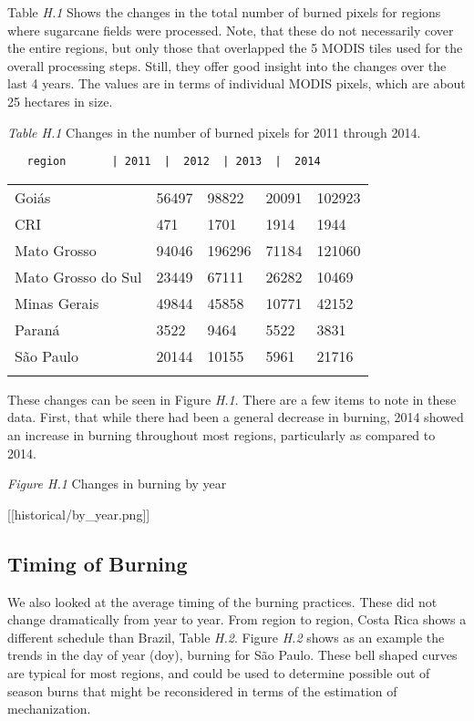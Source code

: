 \documentclass[]{article}
\begin{document}
Table \emph{H.1} Shows the changes in the total number of burned pixels
for regions where sugarcane fields were processed. Note, that these do
not necessarily cover the entire regions, but only those that overlapped
the 5 MODIS tiles used for the overall processing steps. Still, they
offer good insight into the changes over the last 4 years. The values
are in terms of individual MODIS pixels, which are about 25 hectares in
size.

\emph{Table H.1} Changes in the number of burned pixels for 2011 through
2014.

\begin{verbatim}
   region       | 2011  |  2012  | 2013  |  2014  
\end{verbatim}

\begin{longtable}[c]{@{}lllll@{}}
\toprule\addlinespace
Goiás & 56497 & 98822 & 20091 & 102923
\\\addlinespace
CRI & 471 & 1701 & 1914 & 1944
\\\addlinespace
Mato Grosso & 94046 & 196296 & 71184 & 121060
\\\addlinespace
Mato Grosso do Sul & 23449 & 67111 & 26282 & 10469
\\\addlinespace
Minas Gerais & 49844 & 45858 & 10771 & 42152
\\\addlinespace
Paraná & 3522 & 9464 & 5522 & 3831
\\\addlinespace
São Paulo & 20144 & 10155 & 5961 & 21716
\\\addlinespace
\bottomrule
\end{longtable}

These changes can be seen in Figure \emph{H.1}. There are a few items to
note in these data. First, that while there had been a general decrease
in burning, 2014 showed an increase in burning throughout most regions,
particularly as compared to 2014.

\emph{Figure H.1} Changes in burning by year

{[}{[}historical/by\_year.png{]}{]}

\subsection{Timing of Burning}\label{timing-of-burning}

We also looked at the average timing of the burning practices. These did
not change dramatically from year to year. From region to region, Costa
Rica shows a different schedule than Brazil, Table \emph{H.2}. Figure
\emph{H.2} shows as an example the trends in the day of year (doy),
burning for São Paulo. These bell shaped curves are typical for most
regions, and could be used to determine possible out of season burns
that might be reconsidered in terms of the estimation of mechanization.
\end{document}
